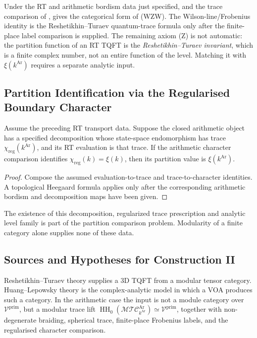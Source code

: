 \begin{remark}
\label{v4-arith:w10-a:rem:RT-closes-WZW-W}
Under the RT and arithmetic bordism data just specified, and the trace
comparison of ,
 gives the categorical
form of (WZW). The Wilson-line/Frobenius identity is the
Reshetikhin--Turaev quantum-trace formula only after the finite-place
label comparison is supplied. The remaining axiom (Z) is not
automatic: the partition function of an RT TQFT is the
\emph{Reshetikhin--Turaev invariant}, which is a finite complex
number, not an entire function of the level. Matching it with
\(\xi(k^{\mathrm{Ar}})\) requires a separate analytic input.
\end{remark}

\subsection{Partition Identification via the Regularised Boundary Character}
\label{v4-arith:w10-a:zhu-mod}

\begin{proposition}
\label{v4-arith:w10-a:prop:RT-Zhu}
Assume the preceding RT transport data. Suppose the closed arithmetic
object has a specified decomposition whose state-space endomorphism
has trace $\chi_{\mathrm{reg}}(k^{\mathrm{Ar}})$, and its RT evaluation
is that trace. If the arithmetic character comparison identifies
$\chi_{\mathrm{reg}}(k)=\xi(k)$, then its partition value is
$\xi(k^{\mathrm{Ar}})$.
\end{proposition}
\begin{proof}
Compose the assumed evaluation-to-trace and trace-to-character
identities. A topological Heegaard formula applies only after the
corresponding arithmetic bordism and decomposition maps have been given.
\end{proof}
The existence of this decomposition, regularized trace prescription
and analytic level family is part of the partition comparison problem.
Modularity of a finite category alone supplies none of these data.

\subsection{Sources and Hypotheses for Construction II}
\label{v4-arith:w10-a:ah:construction-II}

Reshetikhin--Turaev theory supplies a 3D TQFT from a modular tensor
category. Huang--Lepowsky theory is the complex-analytic model in
which a VOA produces such a category. In the arithmetic case the input
is not a module category over \(\mathcal V^{\mathrm{prim}}\), but a
modular trace lift
\(\operatorname{HH}_{0}(\mathcal{MTC}^{\mathrm{Ar}}_{k^{\mathrm{Ar}}})
\simeq\mathcal V^{\mathrm{prim}}\), together with non-degenerate
braiding, spherical trace, finite-place Frobenius labels, and the
regularised character comparison.

